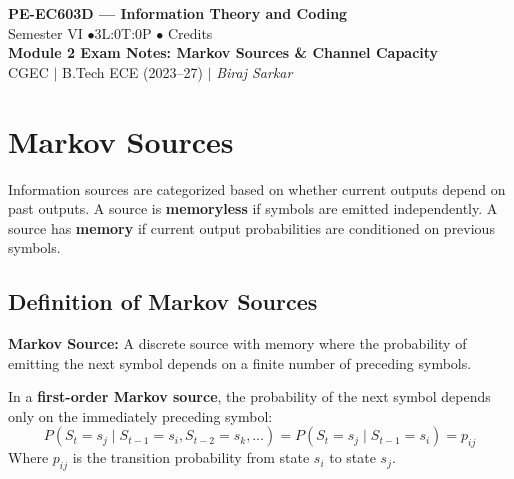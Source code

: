 \documentclass[12pt,a4paper]{article}
\begin{document}

\begin{center}
  {\LARGE\bfseries\color{myred} PE-EC603D --- Information Theory and Coding}\\[5pt]
  {\normalsize\color{mydark} Semester VI \quad$\bullet$\quad 3L:0T:0P \quad$\bullet$ Credits}\\[3pt]
  {\normalsize\color{myteal}\textbf{Module 2 Exam Notes: Markov Sources \& Channel Capacity}}\\[3pt]
  {\small\color{mydark} CGEC \;$|$\; B.Tech ECE (2023--27) \;$|$\; \textit{Biraj Sarkar}}
\end{center}
\vspace{2pt}
\noindent{\color{myred}\rule{\linewidth}{1.5pt}}
\vspace{2pt}

\hypersetup{linkcolor=mydark}
\tableofcontents
\hypersetup{linkcolor=myteal}
\newpage

\section{Markov Sources}

Information sources are categorized based on whether current outputs depend on past outputs. A source is \textbf{memoryless} if symbols are emitted independently. A source has \textbf{memory} if current output probabilities are conditioned on previous symbols.

\subsection{Definition of Markov Sources}
\begin{tcolorbox}[defbox]
\textbf{Markov Source:} A discrete source with memory where the probability of emitting the next symbol depends on a finite number of preceding symbols.
\par\vspace{3pt}
In a \textbf{first-order Markov source}, the probability of the next symbol depends only on the immediately preceding symbol:
\begin{equation}
  P(S_t = s_j \mid S_{t-1} = s_i, S_{t-2} = s_k, \dots) = P(S_t = s_j \mid S_{t-1} = s_i) = p_{ij}
\end{equation}
Where $p_{ij}$ is the transition probability from state $s_i$ to state $s_j$.
\end{tcolorbox}
\end{document}
